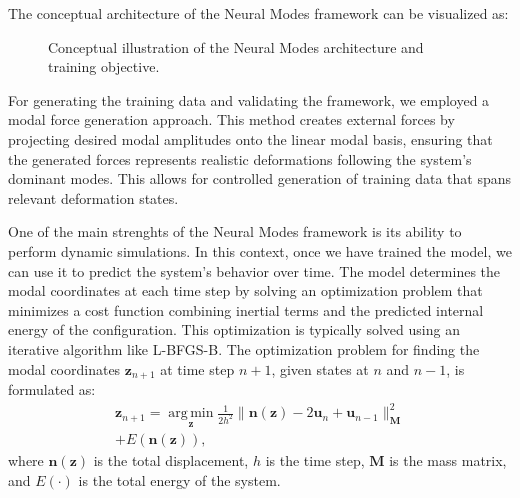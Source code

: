 \documentclass[11pt,a4paper,twocolumn]{article}
\DeclareMathOperator*{\argmin}{arg\,min}
\begin{document}
The conceptual architecture of the Neural Modes framework can be visualized as:

\begin{figure}[H]
    \centering
    \caption{Conceptual illustration of the Neural Modes architecture and training objective.}
    \label{fig:neural_modes_arch_es}
\end{figure}

For generating the training data and validating the framework, we employed a modal force generation approach. This method creates external forces by projecting desired modal amplitudes onto the linear modal basis, ensuring that the generated forces represents realistic deformations following the system's dominant modes. This allows for controlled generation of training data that spans relevant deformation states.

One of the main strenghts of the Neural Modes framework is its ability to perform dynamic simulations. In this context, once we have trained the model, we can use it to predict the system's behavior over time. The model determines the modal coordinates at each time step by solving an optimization problem that minimizes a cost function combining inertial terms and the predicted internal energy of the configuration. This optimization is typically solved using an iterative algorithm like L-BFGS-B. The optimization problem for finding the modal coordinates $\bm{z}_{n+1}$ at time step $n+1$, given states at $n$ and $n-1$, is formulated as:
\begin{equation}
\begin{split}
        \bm{z}_{n+1} = \underset{\bm{z}}{\argmin} \frac{1}{2h^2} \|\bm{n}(\bm{z}) - 2\bm{u}_n + \bm{u}_{n-1}\|_{\bm{M}}^2 \\+ E(\bm{n}(\bm{z})),
\end{split}
    \label{eq:optimization_problem_es}
\end{equation}
where $\bm{n}(\bm{z})$ is the total displacement, $h$ is the time step, $\bm{M}$ is the mass matrix, and $E(\cdot)$ is the total energy of the system. 
\end{document}

